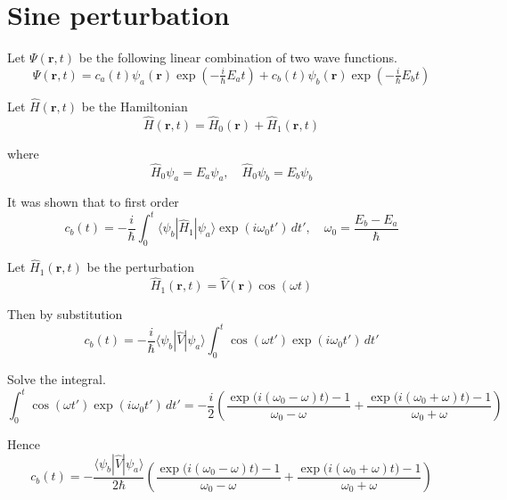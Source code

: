 

\section*{Sine perturbation}

Let $\Psi(\mathbf r,t)$ be the following linear combination of two wave functions.
\begin{equation*}
\Psi(\mathbf r,t)
=c_a(t)\psi_a(\mathbf r)\exp\left(-\tfrac{i}{\hbar}E_at\right)
+c_b(t)\psi_b(\mathbf r)\exp\left(-\tfrac{i}{\hbar}E_bt\right)
\end{equation*}

Let $\hat H(\mathbf r,t)$ be the Hamiltonian
\begin{equation*}
\hat H(\mathbf r,t)=\hat H_0(\mathbf r)+\hat H_1(\mathbf r,t)
\end{equation*}

where
\begin{equation*}
\hat H_0\psi_a=E_a\psi_a,\quad\hat H_0\psi_b=E_b\psi_b
\end{equation*}

It was shown that to first order
\begin{equation*}
c_b(t)=-\frac{i}{\hbar}\int_0^t
\langle\psi_b|\hat H_1|\psi_a\rangle\exp(i\omega_0t')\,dt',\quad\omega_0=\frac{E_b-E_a}{\hbar}
\end{equation*}

Let $\hat H_1(\mathbf r,t)$ be the perturbation
\begin{equation*}
\hat H_1(\mathbf r,t)=\hat V(\mathbf r)\cos(\omega t)
\end{equation*}

Then by substitution
\begin{equation*}
c_b(t)=-\frac{i}{\hbar}\langle\psi_b|\hat V|\psi_a\rangle
\int_0^t\cos(\omega t')\exp(i\omega_0t')\,dt'
\end{equation*}

Solve the integral.
\begin{equation*}
\int_0^t\cos(\omega t')\exp(i\omega_0t')\,dt'
=-\frac{i}{2}
\left(
\frac{\exp\bigl(i(\omega_0-\omega)t\bigr)-1}{\omega_0-\omega}
+\frac{\exp\bigl(i(\omega_0+\omega)t\bigr)-1}{\omega_0+\omega}
\right)
\tag{1}
\end{equation*}

Hence
\begin{equation*}
c_b(t)=-\frac{\langle\psi_b|\hat V|\psi_a\rangle}{2\hbar}
\left(
\frac{\exp\bigl(i(\omega_0-\omega)t\bigr)-1}{\omega_0-\omega}
+\frac{\exp\bigl(i(\omega_0+\omega)t\bigr)-1}{\omega_0+\omega}
\right)
\tag{2}
\end{equation*}

